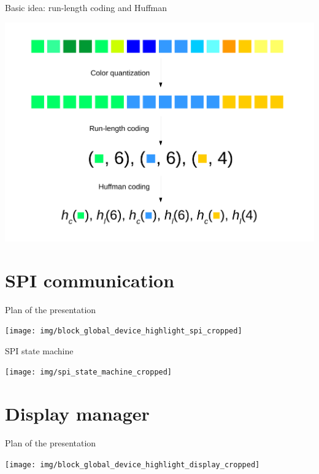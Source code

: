 \documentclass[10pt]{beamer}
\begin{document}
\begin{frame}{Basic idea: run-length coding and Huffman}
    \begin{center}
        \includegraphics[width=1.0\textwidth]{img/compression_scheme}
    \end{center}
\end{frame}

\section{SPI communication}
\begin{frame}{Plan of the presentation}
    \begin{center}
        \texttt{[image: img/block\_global\_device\_highlight\_spi\_cropped]}
    \end{center}
\end{frame}

\begin{frame}{SPI state machine}
    \begin{center}
        \texttt{[image: img/spi\_state\_machine\_cropped]}
    \end{center}
\end{frame}


\section{Display manager}
\begin{frame}{Plan of the presentation}
    \begin{center}
        \texttt{[image: img/block\_global\_device\_highlight\_display\_cropped]}
    \end{center}
\end{frame}
\end{document}
